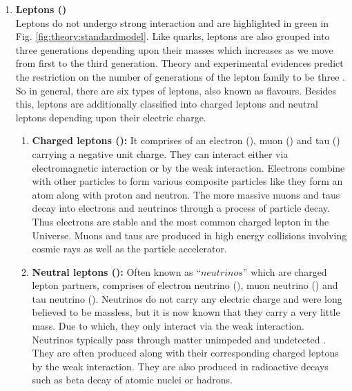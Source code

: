 \begin{enumerate}
	\item \textbf{Leptons (\Plepton)} \label{sec:theory:standardmodel:fundamentalparticles:fermion:leptons}
	\\ Leptons do not undergo strong interaction and are highlighted in green in Fig. \ref{fig:theory:standardmodel}. Like quarks, leptons are also grouped into three generations depending upon their masses which increases as we move from first to the third generation. Theory and experimental evidences predict the restriction on the number of generations of the lepton family to be three \cite{thomson}. So in general, there are six types of leptons, also known as flavours. Besides this, leptons are additionally classified into charged leptons and neutral leptons depending upon their electric charge. 
	
	\begin{enumerate}
		\item \textbf{Charged leptons (\Pleptonpm):} It comprises of an electron (\Pelectron), muon (\Pmuon) and tau (\Ptau) carrying a negative unit charge. They can interact either via electromagnetic interaction or by the weak interaction. Electrons combine with other particles to form various composite particles like they form an atom along with proton and neutron. The more massive muons and taus decay into electrons and neutrinos through a process of particle decay. Thus electrons are stable and the most common charged lepton in the Universe. Muons and taus are produced in high energy collisions involving cosmic rays as well as the particle accelerator.
		
		\item \textbf{Neutral leptons (\Plepton):} Often known as \enquote{$neutrinos$} which are charged lepton partners, comprises of electron neutrino (\Pnue), muon neutrino (\Pnum) and tau neutrino (\Pnut). Neutrinos do not carry any electric charge and were long believed to be massless, but it is now known that they carry a very little mass. Due to which, they only interact via the weak interaction. Neutrinos typically pass through matter unimpeded and undetected \cite{neutrino}. They are often produced along with their corresponding charged leptons by the weak interaction. They are also produced in radioactive decays such as beta decay of atomic nuclei or hadrons.
	\end{enumerate}
	

\end{enumerate}
